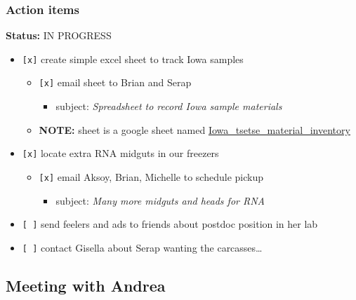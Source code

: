 \documentclass[letterpaper]{scrartcl}
\begin{document}
\subsubsection{Action items}\label{action-items}

\textbf{Status:} IN PROGRESS

\begin{itemize}
\itemsep1pt\parskip0pt
\item
  \texttt{{[}x{]}} create simple excel sheet to track Iowa samples

  \begin{itemize}
  \itemsep1pt\parskip0pt
  \item
    \texttt{{[}x{]}} email sheet to Brian and Serap

    \begin{itemize}
    \itemsep1pt\parskip0pt
    \item
      subject: \emph{Spreadsheet to record Iowa sample materials}
    \end{itemize}
  \item
    \textbf{NOTE:} sheet is a google sheet named
    \href{https://docs.google.com/spreadsheets/d/1SeoKnRQ0djB1xjyVGQy-NikNFTzQ-wL-hXCwUZAoNqw/edit?usp=sharing}{Iowa\_tsetse\_material\_inventory}
  \end{itemize}
\item
  \texttt{{[}x{]}} locate extra RNA midguts in our freezers

  \begin{itemize}
  \itemsep1pt\parskip0pt
  \item
    \texttt{{[}x{]}} email Aksoy, Brian, Michelle to schedule pickup

    \begin{itemize}
    \itemsep1pt\parskip0pt
    \item
      subject: \emph{Many more midguts and heads for RNA}
    \end{itemize}
  \end{itemize}
\item
  \texttt{{[} {]}} send feelers and ads to friends about postdoc
  position in her lab
\item
  \texttt{{[} {]}} contact Gisella about Serap wanting the
  carcasses\ldots{}
\end{itemize}

\subsection{Meeting with Andrea}\label{meeting-with-andrea}
\end{document}
